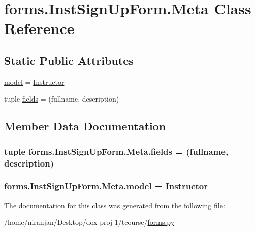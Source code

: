 \hypertarget{classforms_1_1_inst_sign_up_form_1_1_meta}{}\section{forms.\+Inst\+Sign\+Up\+Form.\+Meta Class Reference}
\label{classforms_1_1_inst_sign_up_form_1_1_meta}
\subsection*{Static Public Attributes}
\begin{DoxyCompactItemize}
\item 
\hyperlink{classforms_1_1_inst_sign_up_form_1_1_meta_a0974997693eceaaa728054ec1b59281f}{model} = \hyperlink{classmodels_1_1_instructor}{Instructor}
\item 
tuple \hyperlink{classforms_1_1_inst_sign_up_form_1_1_meta_a6d2289b31171f06e8eee6081ceabe2c2}{fields} = (\textquotesingle{}fullname\textquotesingle{}, \textquotesingle{}description\textquotesingle{})
\end{DoxyCompactItemize}


\subsection{Member Data Documentation}
\subsubsection[{\texorpdfstring{fields}{fields}}]{\setlength{\rightskip}{0pt plus 5cm}tuple forms.\+Inst\+Sign\+Up\+Form.\+Meta.\+fields = (\textquotesingle{}fullname\textquotesingle{}, \textquotesingle{}description\textquotesingle{})\hspace{0.3cm}{\ttfamily [static]}}\hypertarget{classforms_1_1_inst_sign_up_form_1_1_meta_a6d2289b31171f06e8eee6081ceabe2c2}{}\label{classforms_1_1_inst_sign_up_form_1_1_meta_a6d2289b31171f06e8eee6081ceabe2c2}
\subsubsection[{\texorpdfstring{model}{model}}]{\setlength{\rightskip}{0pt plus 5cm}forms.\+Inst\+Sign\+Up\+Form.\+Meta.\+model = {\bf Instructor}\hspace{0.3cm}{\ttfamily [static]}}\hypertarget{classforms_1_1_inst_sign_up_form_1_1_meta_a0974997693eceaaa728054ec1b59281f}{}\label{classforms_1_1_inst_sign_up_form_1_1_meta_a0974997693eceaaa728054ec1b59281f}


The documentation for this class was generated from the following file\+:\begin{DoxyCompactItemize}
\item 
/home/niranjan/\+Desktop/dox-\/proj-\/1/tcourse/\hyperlink{forms_8py}{forms.\+py}\end{DoxyCompactItemize}

